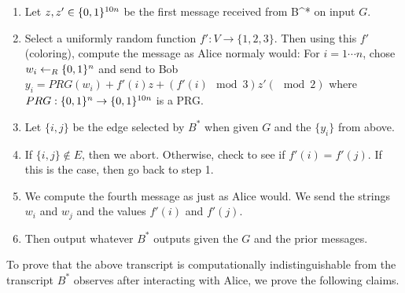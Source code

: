 \documentclass{article}
\begin{document}
\begin{enumerate}[noitemsep,topsep=\mdcompacttopsep,label=\alph*.]
\begin{mdbmarginx}{1ex}{0pt}{1ex}{0pt}
\begin{enumerate}[noitemsep,topsep=\mdcompacttopsep]%

\item{}Let $z,z' \in \{0,1\}^{10n}$ be the first message received from B\textasciicircum{}* on input $G$.%

\item{}Select a uniformly random function $f': V \to \{1,2,3\}$. Then using this $f'$ (coloring),
compute the message as Alice normaly would: For $i = 1\cdots n$, chose $w_i \gets_R \{0,1\}^n$ and
send to Bob $y_i = PRG(w_i) + f'(i)z + (f'(i) \mod 3)z'(\mod 2)$ where $PRG : \{0,1\}^n \to \{0,1\}^{10n}$
is a PRG.%

\item{}Let $\{i,j\}$ be the edge selected by $B^*$ when given $G$ and the $\{y_i\}$ from above.%

\item{}If $\{i,j\} \notin E$, then we abort. Otherwise, check to see if $f'(i) = f'(j)$. If this is the
case, then go back to step 1.%

\item{}We compute the fourth message as just as Alice would. We send the strings $w_i$ and $w_j$ and
the values $f'(i)$ and $f'(j)$.%

\item{}
Then output whatever $B^*$ outputs given the $G$ and the prior messages.%
\end{enumerate}%

\noindent{}To prove that the above transcript is computationally indistinguishable from the transcript $B^*$
observes after interacting with Alice, we prove the following claims.%


\end{mdbmarginx}
\end{enumerate}
\end{document}
